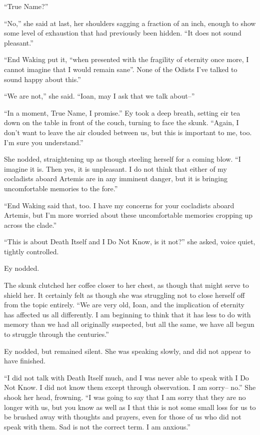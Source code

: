 ``True Name?''

``No,'' she said at last, her shoulders sagging a fraction of an inch, enough to show some level of exhaustion that had previously been hidden. ``It does not sound pleasant.''

``End Waking put it, ``when presented with the fragility of eternity once more, I cannot imagine that I would remain sane''. None of the Odists I've talked to sound happy about this.''

``We are not,'' she said. ``Ioan, may I ask that we talk about--''

``In a moment, True Name, I promise.'' Ey took a deep breath, setting eir tea down on the table in front of the couch, turning to face the skunk. ``Again, I don't want to leave the air clouded between us, but this is important to me, too. I'm sure you understand.''

She nodded, straightening up as though steeling herself for a coming blow. ``I imagine it is. Then yes, it is unpleasant. I do not think that either of my cocladists aboard Artemis are in any imminent danger, but it is bringing uncomfortable memories to the fore.''

``End Waking said that, too. I have my concerns for your cocladists aboard Artemis, but I'm more worried about these uncomfortable memories cropping up across the clade.''

``This is about Death Itself and I Do Not Know, is it not?'' she asked, voice quiet, tightly controlled.

Ey nodded.

The skunk clutched her coffee closer to her chest, as though that might serve to shield her. It certainly felt as though she was struggling not to close herself off from the topic entirely. ``We are very old, Ioan, and the implication of eternity has affected us all differently. I am beginning to think that it has less to do with memory than we had all originally suspected, but all the same, we have all begun to struggle through the centuries.''

Ey nodded, but remained silent. She was speaking slowly, and did not appear to have finished.

``I did not talk with Death Itself much, and I was never able to speak with I Do Not Know. I did not know them except through observation. I am sorry-- no.'' She shook her head, frowning. ``I was going to say that I am sorry that they are no longer with us, but you know as well as I that this is not some small loss for us to be brushed away with thoughts and prayers, even for those of us who did not speak with them. Sad is not the correct term. I am anxious.''

